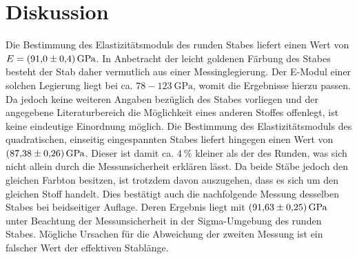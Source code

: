 
\section{Diskussion}
\label{sec:Diskussion}
Die Bestimmung des Elastizitätsmoduls des runden Stabes liefert einen Wert von
 $E = \SI{91.0 \pm 0.4}{\giga\pascal}$. In Anbetracht der leicht goldenen Färbung
  des Stabes besteht der Stab daher vermutlich aus einer Messinglegierung. Der
  E-Modul einer solchen Legierung liegt bei ca. $78 - \SI{123}{\giga\pascal}$\cite{Elastizitätsmodul},
   womit die Ergebnisse hierzu passen.
  Da jedoch keine weiteren Angaben bezüglich des Stabes vorliegen und der
  angegebene Literaturbereich die Möglichkeit eines anderen Stoffes offenlegt,
  ist keine eindeutige Einordnung möglich. Die Bestimmung des Elastizitätsmoduls
   des quadratischen, einseitig eingespannten Stabes liefert hingegen einen Wert
    von $\SI{87.38 \pm 0.26}{\giga\pascal}$. Dieser ist damit ca. $\SI{4}{\percent}$ kleiner als der des Runden, 
    was sich nicht allein durch die Messunsicherheit erklären lässt. Da beide Stäbe jedoch den gleichen Farbton
     besitzen, ist trotzdem davon auszugehen, dass es sich um den gleichen Stoff handelt. Dies bestätigt auch
      die nachfolgende Messung desselben Stabes bei beidseitiger Auflage. Deren Ergebnis liegt mit $\SI{91.63 \pm 0.25}{\giga\pascal}$ unter Beachtung
       der Messunsicherheit in der Sigma-Umgebung des runden Stabes. Mögliche Ursachen
         für die Abweichung der zweiten Messung ist ein falscher Wert der
         effektiven Stablänge.
